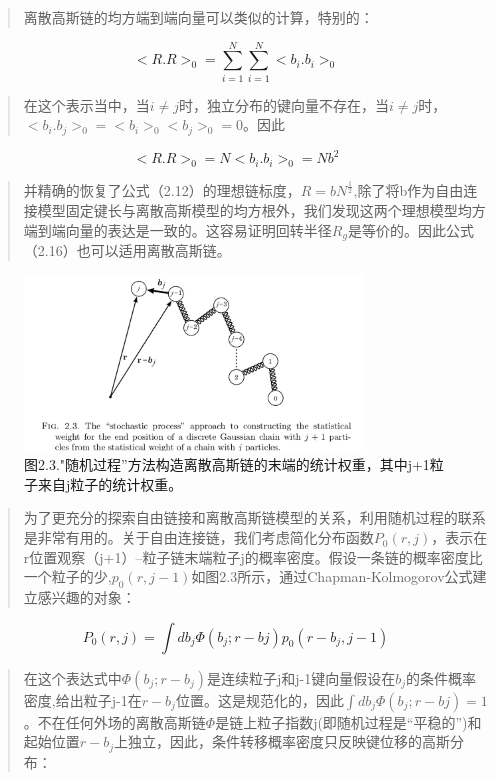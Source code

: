 \begin{quotation}
离散高斯链的均方端到端向量可以类似的计算，特别的：
\end{quotation}
\begin{equation}
<R.R>_{0}=\sum_{i=1}^{N}\sum_{i=1}^{N}<b_{i}.b_{i}>_{0}
\end{equation}
\begin{quotation}
在这个表示当中，当$i\neq j$时，独立分布的键向量不存在，当$i\neq j$时，$<b_{i}.b_{j}>_{0}=<b_{i}>_{0}<b_{j}>_{0}=0$。因此
\end{quotation}
\begin{equation}
<R.R>_{0}=N<b_{i}.b_{i}>_{0}=Nb^2
\end{equation}
\begin{quotation}
并精确的恢复了公式（2.12）的理想链标度，$R=bN^\frac{1}{2}$,除了将b作为自由连接模型固定键长与离散高斯模型的均方根外，我们发现这两个理想模型均方端到端向量的表达是一致的。这容易证明回转半径$R_{g}$是等价的。因此公式（2.16）也可以适用离散高斯链。
\end{quotation}
\begin{figure}
\caption{图2.3."随机过程”方法构造离散高斯链的末端的统计权重，其中j+1粒子来自j粒子的统计权重。}
\centering
\includegraphics[width=9cm]{./figures/23.png}
\end{figure}
\newpage
\begin{quotation}
为了更充分的探索自由链接和离散高斯链模型的关系，利用随机过程的联系是非常有用的。关于自由连接链，我们考虑简化分布函数$P_{0}(r,j)$，表示在r位置观察（j+1）--粒子链末端粒子j的概率密度。假设一条链的概率密度比一个粒子的少,$p_{0}(r,j-1)$如图2.3所示，通过Chapman-Kolmogorov公式建立感兴趣的对象：
\end{quotation}
\begin{equation}
P_{0}(r,j)=\int db_{j} \varPhi (b_{j};r-b{j})p_{0}(r-b_{j},j-1)
\end{equation}
\begin{quotation}
在这个表达式中$\varPhi (b_{j};r-b_{j})$是连续粒子j和j-1键向量假设在$b_{j}$的条件概率密度,给出粒子j-1在$r-b_{j}$位置。这是规范化的，因此$\int db_{j} \varPhi (b_{j};r-b{j})=1$。不在任何外场的离散高斯链$\varPhi$是链上粒子指数j(即随机过程是“平稳的”)和起始位置$r-b_{j}$上独立，因此，条件转移概率密度只反映键位移的高斯分布：
\end{quotation}
